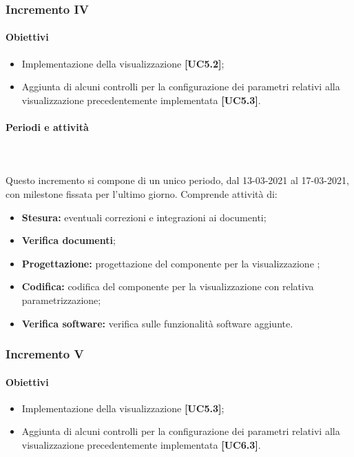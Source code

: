 \subsubsection{Incremento IV}

\paragraph{Obiettivi}
\begin{itemize}
\item Implementazione della visualizzazione  \textbf{[UC5.2]};
\item Aggiunta di alcuni controlli per la configurazione dei parametri relativi alla visualizzazione precedentemente implementata \textbf{[UC5.3]}.
\end{itemize}

\paragraph{Periodi e attività} \mbox{}\\\mbox{}\\
Questo incremento si compone di un unico periodo, dal 13-03-2021 al 17-03-2021, con milestone fissata per l'ultimo giorno. Comprende attività di:
\begin{itemize}
\item \textbf{Stesura:} eventuali correzioni e integrazioni ai documenti;
\item \textbf{Verifica documenti};
\item \textbf{Progettazione:} progettazione del componente per la visualizzazione ;
\item \textbf{Codifica:} codifica del componente per la visualizzazione con relativa parametrizzazione;
\item \textbf{Verifica software:} verifica sulle funzionalità software aggiunte.
\end{itemize}


\subsubsection{Incremento V}

\paragraph{Obiettivi}
\begin{itemize}
\item Implementazione della visualizzazione  \textbf{[UC5.3]};
\item Aggiunta di alcuni controlli per la configurazione dei parametri relativi alla visualizzazione precedentemente implementata \textbf{[UC6.3]}.
\end{itemize}

